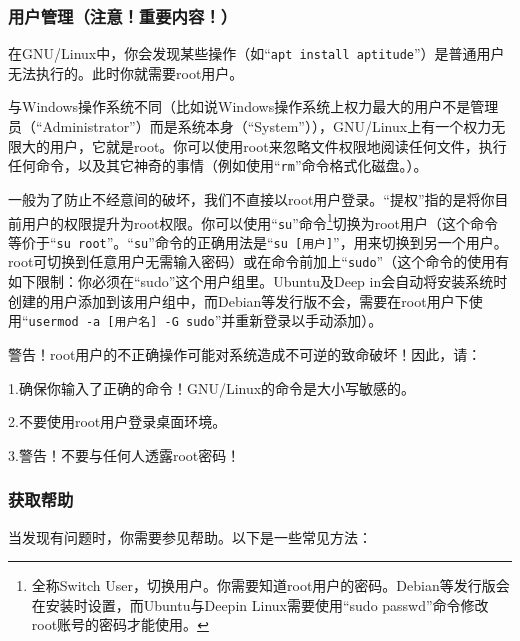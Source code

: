 \subsubsection{用户管理（注意！重要内容！）}
\cite{DebianRef}\par
在GNU/Linux中，你会发现某些操作（如“\verb|apt install aptitude|”）是普通用户无法执行的。此时你就需要root用户。\par
与Windows操作系统不同（比如说Windows操作系统上权力最大的用户不是管理员（“Administrator”）而是系统本身（“System”）），GNU/Linux上有一个权力无限大的用户，它就是root。你可以使用root来忽略文件权限地阅读任何文件，执行任何命令，以及其它神奇的事情（例如使用“\verb|rm|”命令格式化磁盘。）。\par
一般为了防止不经意间的破坏，我们不直接以root用户登录。“提权”指的是将你目前用户的权限提升为root权限。你可以使用“\verb|su|”命令\footnote{全称Switch User，切换用户。你需要知道root用户的密码。Debian等发行版会在安装时设置，而Ubuntu与Deepin Linux需要使用“sudo passwd”命令修改root账号的密码才能使用。}切换为root用户（这个命令等价于“\verb|su root|”。“\verb|su|”命令的正确用法是“\verb|su [用户]|”，用来切换到另一个用户。root可切换到任意用户无需输入密码）或在命令前加上“\verb|sudo|”（这个命令的使用有如下限制：你必须在“sudo”这个用户组里。Ubuntu及Deep in会自动将安装系统时创建的用户添加到该用户组中，而Debian等发行版不会，需要在root用户下使用“\verb|usermod -a [用户名] -G sudo|”并重新登录以手动添加）。\par
{\color{red}警告！root用户的不正确操作可能对系统造成不可逆的致命破坏！因此，请：\par
	1.确保你输入了正确的命令！GNU/Linux的命令是大小写敏感的。\par
	2.不要使用root用户登录桌面环境。\par
	3.警告！不要与任何人透露root密码！}\par
\subsubsection{获取帮助}
\cite{manman}\par
当发现有问题时，你需要参见帮助。以下是一些常见方法：\par
